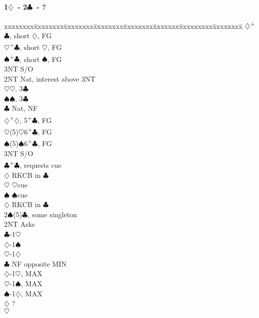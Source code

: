 \documentclass[10pt]{article}
\renewcommand{\c}{$\clubsuit$}
\renewcommand{\d}{$\diamondsuit$}
\newcommand{\h}{$\heartsuit$}
\newcommand{\s}{$\spadesuit$}
\newcommand{\p}{\textsuperscript{+}}
\newenvironment{bidtable}[1][]
{\textbf{#1}
  \begin{adjustwidth}{1em}{}
    \addvspace{2pt}
    \begin{tabbing}
      xxxxxxxx\=xxxxxxxx\=xxxxxxxx\=xxxxxxxx\=xxxxxxxx\=xxxxxxx\=xxxxxxxxx\=xxxxxxxx\=\kill}
{\end{tabbing}\end{adjustwidth}\bigskip}%
\begin{document}
\begin{bidtable}[1\d\ - 2\c\ - ?]
    \>     \>     \d  {}\p\c, short \d, FG \\
    \>     \>     \h  {}\p\c, short \h, FG \\
    \>     \>     \s  {}\p\c, short \s, FG \\
    \>     \>     \> 3NT  \> S/O                 \\
    \> 2NT \> Nat, interest above 3NT            \\
    \>     \h {}\h, 3\c                    \\
    \>     \s {}\s, 3\c                    \\
    \c \> Nat, NF                            \\
    \d {}\p\d, 5\p\c, FG                   \\
    \h {}(5)\h 6\p\c, FG                   \\
    \s {}(5)\s 6\p\c, FG                   \\
    \> 3NT \> S/O                                \\
    \c {}\p\c, requests cue                \\
    \>     \d \> RKCB in \c                  \\
    \>     \h \> \h cue                      \\
    \>     \s \> \s cue                      \\
    \d \> RKCB in \c                         \\
2\s {}(5)\c, some singleton                    \\
    \> 2NT \> Asks                               \\
    \>     \c {}-1\h                            \\
    \>     \d {}-1\s                            \\
    \>     \h {}-1\d                            \\
    \c \> NF opposite MIN                                   \\
    \>     \d {}-1\h, MAX                            \\
    \>     \h {}-1\s, MAX                           \\
    \>     \s {}-1\d, MAX                           \\
    \d \> ?                                   \\
    \h \>                                    \\

\end{bidtable}
\end{document}
